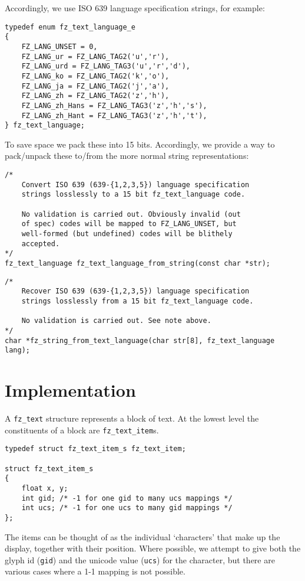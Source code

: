 \documentclass[oneside]{book}
\begin{document}
Accordingly, we use ISO 639 language specification strings, for example:

\begin{lstlisting}
typedef enum fz_text_language_e
{
	FZ_LANG_UNSET = 0,
	FZ_LANG_ur = FZ_LANG_TAG2('u','r'),
	FZ_LANG_urd = FZ_LANG_TAG3('u','r','d'),
	FZ_LANG_ko = FZ_LANG_TAG2('k','o'),
	FZ_LANG_ja = FZ_LANG_TAG2('j','a'),
	FZ_LANG_zh = FZ_LANG_TAG2('z','h'),
	FZ_LANG_zh_Hans = FZ_LANG_TAG3('z','h','s'),
	FZ_LANG_zh_Hant = FZ_LANG_TAG3('z','h','t'),
} fz_text_language;
\end{lstlisting}

To save space we pack these into 15 bits. Accordingly, we provide a way to pack/unpack these to/from the more normal string representations:

\begin{lstlisting}
/*
	Convert ISO 639 (639-{1,2,3,5}) language specification
	strings losslessly to a 15 bit fz_text_language code.

	No validation is carried out. Obviously invalid (out
	of spec) codes will be mapped to FZ_LANG_UNSET, but
	well-formed (but undefined) codes will be blithely
	accepted.
*/
fz_text_language fz_text_language_from_string(const char *str);
\end{lstlisting}
\begin{lstlisting}
/*
	Recover ISO 639 (639-{1,2,3,5}) language specification
	strings losslessly from a 15 bit fz_text_language code.

	No validation is carried out. See note above.
*/
char *fz_string_from_text_language(char str[8], fz_text_language lang);
\end{lstlisting}

\section{Implementation}
\label{TextImplementation}


A \texttt{fz\_text} structure represents a block of text. At the lowest level the constituents of a block are \texttt{fz\_text\_item}s.

\begin{lstlisting}
typedef struct fz_text_item_s fz_text_item;

struct fz_text_item_s
{
	float x, y;
	int gid; /* -1 for one gid to many ucs mappings */
	int ucs; /* -1 for one ucs to many gid mappings */
};
\end{lstlisting}

The items can be thought of as the individual `characters' that make up the display, together with their position. Where possible, we attempt to give both the glyph id (\texttt{gid}) and the unicode value (\texttt{ucs}) for the character, but there are various cases where a 1-1 mapping is not possible.
\end{document}
